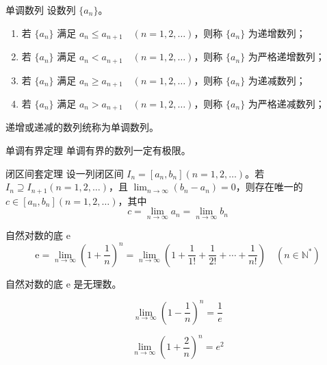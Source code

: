 \begin{definition}{单调数列}
    设数列 $\{a_n\}$。
    \begin{enumerate}
        \item 若 $\{a_n\}$ 满足 $a_n \leqslant a_{n + 1}\quad (n=1,2, \ldots)$，则称 $\{a_n\}$ 为递增数列；
        \item 若 $\{a_n\}$ 满足 $a_n < a_{n + 1}\quad (n=1,2, \ldots)$，则称 $\{a_n\}$ 为严格递增数列；
        \item 若 $\{a_n\}$ 满足 $a_n \geqslant a_{n + 1}\quad (n=1,2, \ldots)$，则称 $\{a_n\}$ 为递减数列；
        \item 若 $\{a_n\}$ 满足 $a_n > a_{n + 1}\quad (n=1,2, \ldots)$，则称 $\{a_n\}$ 为严格递减数列；
    \end{enumerate}
    递增或递减的数列统称为单调数列。
\end{definition}

\begin{theorem}{单调有界定理}
    单调有界的数列一定有极限。
\end{theorem}

\begin{theorem}{闭区间套定理}
    设一列闭区间 $I_n = [a_n, b_n](n = 1,2, \ldots)$。若 $I_n \supseteq I_{n + 1}(n = 1,2, \ldots)$，且 $\displaystyle \lim_{n \to \infty}(b_n - a_n) = 0$，则存在唯一的 $c \in [a_n, b_n](n = 1,2, \ldots)$，其中
    \[c = \lim_{n \to \infty}a_n = \lim_{n \to \infty}b_n\]
\end{theorem}

\begin{theorem}{自然对数的底 e}
    \[\mathrm{e} = \lim_{n \to \infty}\left(1 + \frac{1}{n}\right)^{n} = \lim_{n \to \infty}\left(1 + \frac{1}{1!} + \frac{1}{2!} + \cdots + \frac{1}{n!}\right)\quad (n \in \mathbb{N}^{*})\]
\end{theorem}

\begin{theorem}
    自然对数的底 $\mathrm{e}$ 是无理数。
\end{theorem}

\hfill

\begin{example}
    \[\lim_{n \to \infty}\left(1 - \frac{1}{n}\right)^{n} = \frac{1}{e}\]
\end{example}

\hfill

\begin{example}
    \[\lim_{n \to \infty}\left(1 + \frac{2}{n}\right)^{n} = e^2\]
\end{example}

